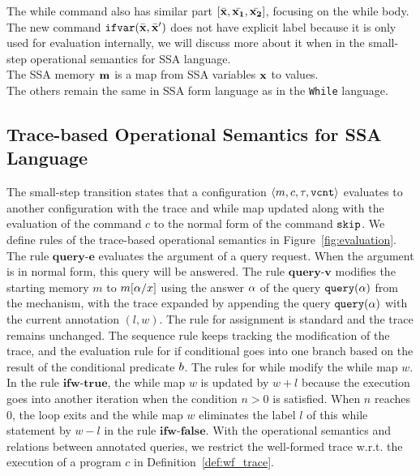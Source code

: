 The while command also has similar part $ [\bar{{\boldsymbol{\mathbf{x}}}}, \bar{{\boldsymbol{\mathbf{x_1}}}}, \bar{{\boldsymbol{\mathbf{x_2}}}}]$, focusing on the while body. 
The new command ${{\mathtt{ifvar}(\bar{{\boldsymbol{\mathbf{x}}}}, \bar{{\boldsymbol{\mathbf{x}}}}')}}$ does not have explicit label because it is only used for evaluation internally, we will discuss more about it when in the 
small-step operational semantics for SSA language. 
%
\\
The SSA memory ${\boldsymbol{\mathbf{m}}}$ is a map from SSA variables ${\boldsymbol{\mathbf{x}}}$ to values.
%
\\
The others remain the same in SSA form language as in the {\tt While} language.
%
%
%
\subsection{Trace-based Operational Semantics for SSA Language}
{
%
%
The small-step transition states that a configuration $\langle m,c, \mathtt{\tau}, \mathtt{vcnt} \rangle$ evaluates to another configuration with the trace and while map updated along with the evaluation of the command $c$ to the normal form of the command $\mathtt{skip}$.  
We define rules of the trace-based operational semantics in Figure~\ref{fig:evaluation}.
%
%
The rule $\textbf{query-e}$ evaluates the argument of a query request. When the argument is in normal form, this query will be answered.
%
The rule $\textbf{query-v}$ modifies the starting memory $m$ to $m[\alpha/x]$ using the answer $\alpha$ of the query ${\tt query}(\alpha)$ from the mechanism, 
with the trace expanded by appending the query ${\tt query}(\alpha)$ with the current annotation $(l,w)$. 
%
The rule for assignment is standard and the trace remains unchanged.%
The sequence rule keeps tracking the modification of the trace, and the evaluation rule for if conditional goes into one branch based on the result of the conditional predicate $b$. 
%
The rules for while modify the while map $w$. 
In the rule $\textbf{ifw-true}$, the while map $w$ is updated by $w + l$ because the execution goes into another iteration when the condition $n >0$ is satisfied. 
%
When $n$ reaches $0$, the loop exits and the while map $w$ eliminates the label $l$ of this while statement by $w - l$ in the rule $\textbf{ifw-false}$.  
With the operational semantics and relations between annotated queries, we restrict the well-formed trace w.r.t. the execution of a program $c$ in Definition~\ref{def:wf_trace}.
%
%
%
%
\begin{figure}
\end{figure}}
